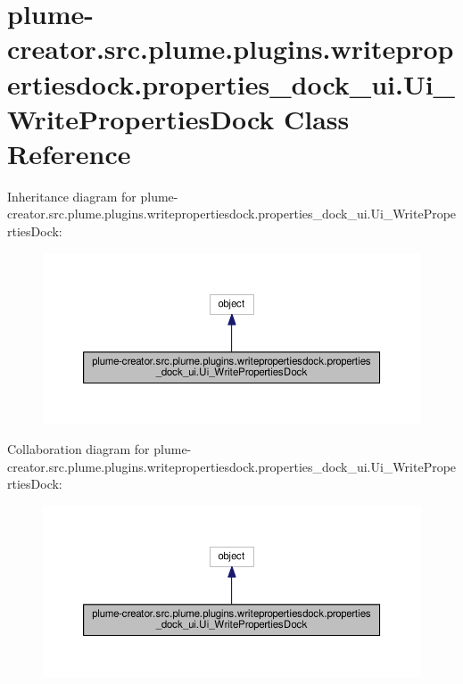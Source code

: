 \hypertarget{classplume-creator_1_1src_1_1plume_1_1plugins_1_1writepropertiesdock_1_1properties__dock__ui_1_1_ui___write_properties_dock}{}\section{plume-\/creator.src.\+plume.\+plugins.\+writepropertiesdock.\+properties\+\_\+dock\+\_\+ui.\+Ui\+\_\+\+Write\+Properties\+Dock Class Reference}
\label{classplume-creator_1_1src_1_1plume_1_1plugins_1_1writepropertiesdock_1_1properties__dock__ui_1_1_ui___write_properties_dock}


Inheritance diagram for plume-\/creator.src.\+plume.\+plugins.\+writepropertiesdock.\+properties\+\_\+dock\+\_\+ui.\+Ui\+\_\+\+Write\+Properties\+Dock\+:\nopagebreak
\begin{figure}[H]
\begin{center}
\leavevmode
\includegraphics[width=350pt]{classplume-creator_1_1src_1_1plume_1_1plugins_1_1writepropertiesdock_1_1properties__dock__ui_1_1bf52d3f4a78ddfe727732cf89854b6fe}
\end{center}
\end{figure}


Collaboration diagram for plume-\/creator.src.\+plume.\+plugins.\+writepropertiesdock.\+properties\+\_\+dock\+\_\+ui.\+Ui\+\_\+\+Write\+Properties\+Dock\+:\nopagebreak
\begin{figure}[H]
\begin{center}
\leavevmode
\includegraphics[width=350pt]{classplume-creator_1_1src_1_1plume_1_1plugins_1_1writepropertiesdock_1_1properties__dock__ui_1_14d765934b305c649e21c3bb074451cef}
\end{center}
\end{figure}
